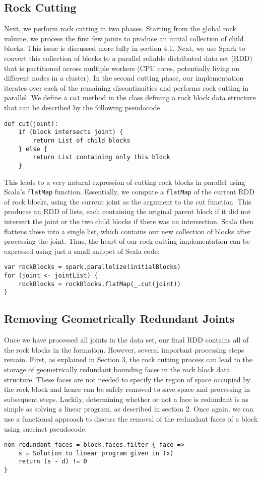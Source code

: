 \subsection{Rock Cutting}
Next, we perform rock cutting in two phases. Starting from the global rock volume, we process the first few joints to produce an initial collection of child blocks. This issue is discussed more fully in section 4.1. Next, we use Spark to convert this collection of blocks to a parallel reliable distributed data set (RDD) that is partitioned across multiple workers (CPU cores, potentially living on different nodes in a cluster). In the second cutting phase, our implementation iterates over each of the remaining discontinuities and performs rock cutting in parallel. We define a \texttt{cut} method in the class defining a rock block data structure that can be described by the following pseudocode.
\begin{verbatim}
def cut(joint):
    if (block intersects joint) {
        return List of child blocks
    } else {
        return List containing only this block
    }
\end{verbatim}
This leads to a very natural expression of cutting rock blocks in parallel using Scala's \texttt{flatMap} function. Essentially, we compute a \texttt{flatMap} of the current RDD of rock blocks, using the current joint as the argument to the cut function. This produces an RDD of lists, each containing the original parent block if it did not intersect the joint or the two child blocks if there was an intersection. Scala then flattens these into a single list, which contains our new collection of blocks after processing the joint. Thus, the heart of our rock cutting implementation can be expressed using just a small snippet of Scala code:
\begin{verbatim}
var rockBlocks = spark.parallelize(initialBlocks)
for (joint <- jointList) {
    rockBlocks = rockBlocks.flatMap(_.cut(joint))
}
\end{verbatim}

\subsection{Removing Geometrically Redundant Joints}
Once we have processed all joints in the data set, our final RDD contains all of the rock blocks in the formation. However, several important processing steps remain. First, as explained in Section 3, the rock cutting process can lead to the storage of geometrically redundant bounding faces in the rock block data structure. These faces are not needed to specify the region of space occupied by the rock block and hence can be safely removed to save space and processing in subsequent steps. Luckily, determining whether or not a face is redundant is as simple as solving a linear program, as described in section 2. Once again, we can use a functional approach to discuss the removal of the redundant faces of a block using succinct pseudocode.
\begin{verbatim}
non_redundant_faces = block.faces.filter { face =>
    s = Solution to linear program given in (x)
    return (s - d) != 0
}
\end{verbatim}

